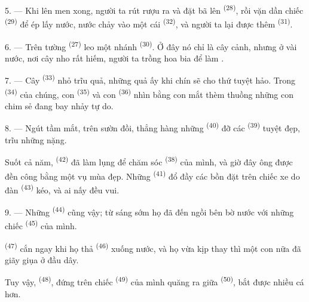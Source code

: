 5. --- Khi lên men xong, người ta rút rượu ra và đặt bã lên 
\textsuperscript{(28)}, rồi vặn dần chiếc  \textsuperscript{(29)} để ép
lấy nước, nước chảy vào một cái  \textsuperscript{(32)}, và người ta lại
được thêm  \textsuperscript{(31)}.

\VUsaut{6.0mm}
\VUsaut{3.4mm}

6. --- Trên tường  \textsuperscript{(27)} leo một nhánh  \textsuperscript{(30)}. Ở đây nó chỉ là cây cảnh, nhưng ở vài nước, nơi cây nho rất
hiếm, người ta trồng hoa bia để làm .

7. --- Cây  \textsuperscript{(33)} nhỏ trĩu quả, những quả ấy khi chín sẽ cho
thứ  tuyệt hảo. Trong  \textsuperscript{(34)} của chúng,
con  \textsuperscript{(35)} và con 
\textsuperscript{(36)} nhìn bằng con mắt thèm thuồng những con chim sẻ đang bay nhảy tự
do.

8. --- Ngút tầm mắt, trên sườn đồi, thẳng hàng những 
\textsuperscript{(40)} đỡ các  \textsuperscript{(39)} tuyệt đẹp, trĩu
những  nặng.

Suốt cả năm,  \textsuperscript{(42)} đã làm lụng để chăm sóc
 \textsuperscript{(38)} của mình, và giờ đây ông được đền công bằng một
vụ mùa đẹp. Những  \textsuperscript{(41)} đổ đầy các bồn đặt trên
chiếc xe do đàn  \textsuperscript{(43)} kéo, và ai nấy đều vui.

\VUsaut{5.0mm}
\VUsaut{3.4mm}

9. --- Những  \textsuperscript{(44)} cũng vậy; từ sáng sớm họ đã
đến ngồi bên bờ nước với những chiếc  \textsuperscript{(45)} của mình.

 \textsuperscript{(47)} cắn  ngay khi họ thả  \textsuperscript{(46)} xuống nước, và họ vừa kịp thay  thì một con nữa
đã giãy giụa ở đầu dây.

Tuy vậy,  \textsuperscript{(48)}, đứng trên chiếc 
\textsuperscript{(49)} của mình quăng  ra giữa 
\textsuperscript{(50)}, bắt được nhiều cá hơn.

